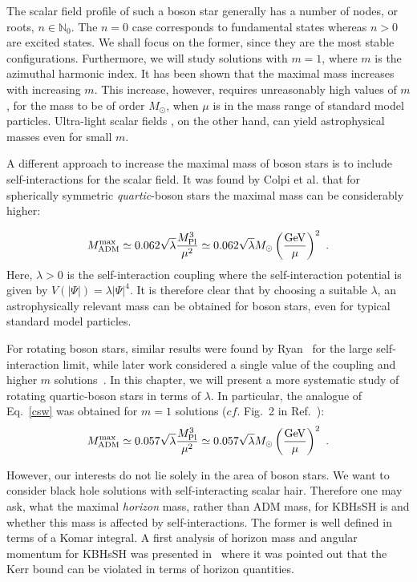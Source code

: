 The scalar field profile of such a boson star generally has a number of nodes, or roots, $n\in \mathbb{N}_0$. The $n=0$ case corresponds to fundamental states whereas $n>0$ are excited states. We shall focus on the former, since they are the most stable configurations.
Furthermore, we will study solutions with $m=1$, where $m$ is the azimuthal harmonic index.
It has been shown that the maximal mass increases with increasing $m$.\cite{Liebling:2012fv,Yoshida:1997qf,Grandclement:2014msa}
This increase, however, requires  unreasonably high values of $m$, for the mass to be of order $M_{\odot}$, when $\mu$ is in the mass range of standard model particles. Ultra-light scalar fields
, on the other hand, can yield astrophysical masses even for small $m$. 

A different approach to increase the maximal mass of boson stars is to include self-interactions for the scalar field.
It was found by Colpi et al.\cite{Colpi:1986ye} that for spherically symmetric \textit{quartic}-boson stars the maximal mass can be considerably higher:

\begin{equation}
 M_{\rm ADM}^{\rm max}\simeq 
0.062  \sqrt{\lambda}\frac{M_{\rm Pl}^3}{\mu^2}\simeq 0.062  \sqrt{\lambda}M_\odot \left(\frac{\rm GeV}{\mu}\right)^2\ .
\label{csw}
\end{equation}
Here, $\lambda>0$ is the self-interaction coupling where the self-interaction potential is given by $V(|\Psi|)=\lambda|\Psi|^4$.
It is therefore clear that by choosing a suitable $\lambda$, an astrophysically relevant mass can be obtained for boson stars, even for typical standard model particles.

For rotating boson stars, similar results were found by Ryan~\cite{Ryan:1996nk} for the large self-interaction limit, while later work considered a single value of the coupling and higher $m$ solutions~\cite{Grandclement:2014msa,Kleihaus:2015iea}.
In this chapter, we will present a more systematic study of rotating quartic-boson stars in terms of $\lambda$.
In particular, the analogue of Eq.~\eqref{csw} was obtained for $m=1$ solutions ($cf.$ Fig.~2 in Ref.~\cite{Herdeiro:2015tia}):
%
\begin{equation}
M_{\rm ADM}^{\rm max}\simeq 
0.057  \sqrt{\lambda}\frac{M_{\rm Pl}^3}{\mu^2}\simeq 0.057  \sqrt{\lambda}M_\odot \left(\frac{\rm GeV}{\mu}\right)^2\ .
\label{quartic_rotating}
\end{equation}

However, our interests do not lie solely in the area of boson stars.
We want to consider black hole solutions with self-interacting scalar hair.
Therefore one may ask, what the maximal \textit{horizon} mass, rather than ADM mass, for KBHsSH is and whether this mass is affected by self-interactions.
The former is well defined in terms of a Komar integral.
A first analysis of horizon mass and angular momentum for KBHsSH was presented in~\cite{Herdeiro:2015moa} where it was pointed out that the Kerr bound can be violated in terms of horizon quantities.

